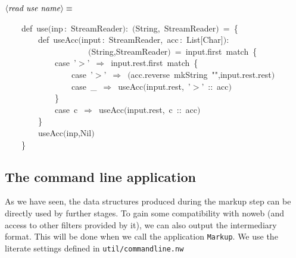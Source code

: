 \documentclass[a4paper,12pt]{article}
\begin{document}
$\left<\mbox{\emph{read use name}}\right>\equiv$
\begin{program}~~~~{\vem def}~use$($inp\,{\rm :}~StreamReader$)${\rm :}~$($String,~StreamReader$)$~=~{\small\{}
\\~~~~~~~~{\vem def}~useAcc$($input\,{\rm :}~StreamReader,~acc\,{\rm :}~List$[$Char$]$$)${\rm :}
\\~~~~~~~~~~~~~~~~~~~~$($String,StreamReader$)$~=~input.first~{\vem match}~{\small\{}
\\~~~~~~~~~~~~{\vem case}~'$>$'~$\Rightarrow$~input.rest.first~{\vem match}~{\small\{}
\\~~~~~~~~~~~~~~~~{\vem case}~'$>$'~$\Rightarrow$~$($acc.reverse~mkString~"",input.rest.rest$)$
\\~~~~~~~~~~~~~~~~{\vem case}~\_~$\Rightarrow$~useAcc$($input.rest,~'$>$'~{\rm :}{\rm :}~acc$)$
\\~~~~~~~~~~~~{\small\}}
\\~~~~~~~~~~~~{\vem case}~c~$\Rightarrow$~useAcc$($input.rest,~c~{\rm :}{\rm :}~acc$)$
\\~~~~~~~~{\small\}}
\\[0.5em]~~~~~~~~useAcc$($inp,Nil$)$
\\~~~~{\small\}}
\\[0.5em]
\end{program}



\subsection{The command line application}
As we have seen, the data structures produced during the markup step can
be directly used by further stages. To gain some compatibility with noweb
(and access to other filters provided by it), we can also output the
intermediary format. This will be done when we call the application
\texttt{Markup}. We use the literate settings defined in \texttt{util/commandline.nw}
\end{document}
